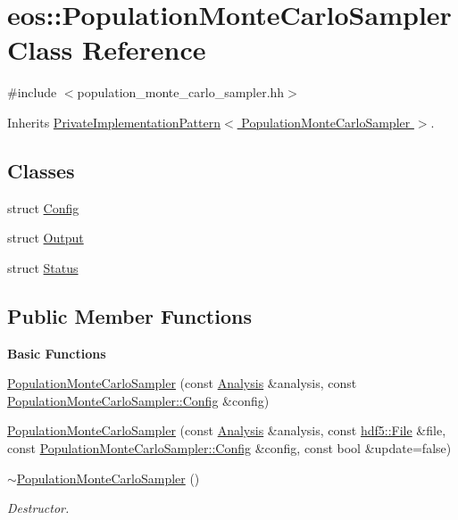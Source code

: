 \hypertarget{classeos_1_1PopulationMonteCarloSampler}{
\section{eos::PopulationMonteCarloSampler Class Reference}
\label{classeos_1_1PopulationMonteCarloSampler}
}


{\ttfamily \#include $<$population\_\-monte\_\-carlo\_\-sampler.hh$>$}

Inherits \hyperlink{classeos_1_1PrivateImplementationPattern}{PrivateImplementationPattern$<$ PopulationMonteCarloSampler $>$}.\subsection*{Classes}
\begin{DoxyCompactItemize}
\item 
struct \hyperlink{structeos_1_1PopulationMonteCarloSampler_1_1Config}{Config}
\item 
struct \hyperlink{structeos_1_1PopulationMonteCarloSampler_1_1Output}{Output}
\item 
struct \hyperlink{structeos_1_1PopulationMonteCarloSampler_1_1Status}{Status}
\end{DoxyCompactItemize}
\subsection*{Public Member Functions}
\begin{Indent}{\bf Basic Functions}\par
{\em \label{_amgrp2386c9a1f1785edee33f374dd2db9b3d}
 }\begin{DoxyCompactItemize}
\item 
\hyperlink{classeos_1_1PopulationMonteCarloSampler_af17458cf45dd30ed7328b88af1ad7ffd}{PopulationMonteCarloSampler} (const \hyperlink{classeos_1_1Analysis}{Analysis} \&analysis, const \hyperlink{structeos_1_1PopulationMonteCarloSampler_1_1Config}{PopulationMonteCarloSampler::Config} \&config)
\item 
\hyperlink{classeos_1_1PopulationMonteCarloSampler_a0a691ab9f41782d8c059685a3bc1998c}{PopulationMonteCarloSampler} (const \hyperlink{classeos_1_1Analysis}{Analysis} \&analysis, const \hyperlink{classeos_1_1hdf5_1_1File}{hdf5::File} \&file, const \hyperlink{structeos_1_1PopulationMonteCarloSampler_1_1Config}{PopulationMonteCarloSampler::Config} \&config, const bool \&update=false)
\item 
\hyperlink{classeos_1_1PopulationMonteCarloSampler_a10bebcfd46a9a9c8925de30e78f192ef}{$\sim$PopulationMonteCarloSampler} ()
\begin{DoxyCompactList}\small\item\em Destructor. \item\end{DoxyCompactList}\end{DoxyCompactItemize}
\end{Indent}
